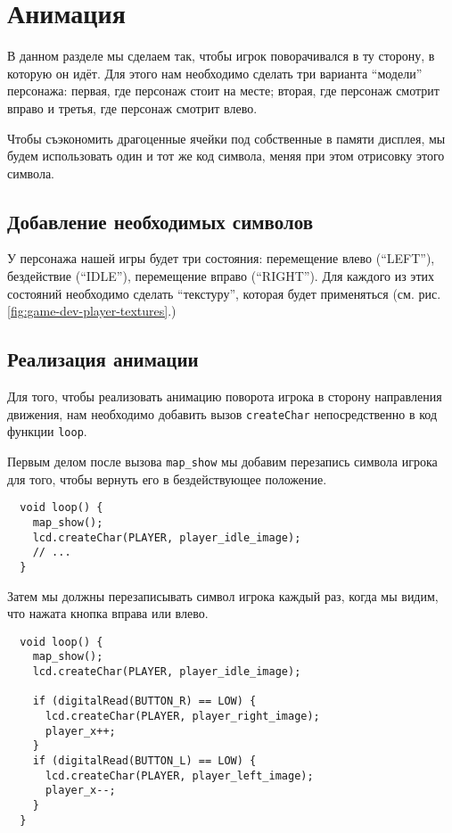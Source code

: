 \documentclass[../sparc.tex]{subfiles}
\begin{document}
\section{Анимация}

В данном разделе мы сделаем так, чтобы игрок поворачивался в ту сторону, в
которую он идёт.  Для этого нам необходимо сделать три варианта ``модели''
персонажа: первая, где персонаж стоит на месте; вторая, где персонаж смотрит
вправо и третья, где персонаж смотрит влево.

Чтобы съэкономить драгоценные ячейки под собственные в памяти дисплея, мы будем
использовать один и тот же код символа, меняя при этом отрисовку этого символа.

\subsection{Добавление необходимых символов}

У персонажа нашей игры будет три состояния: перемещение влево (``LEFT''),
бездействие (``IDLE''), перемещение вправо (``RIGHT'').  Для каждого из этих
состояний необходимо сделать ``текстуру'', которая будет применяться
(см. рис. \ref{fig:game-dev-player-textures}.)


\subsection{Реализация анимации}

Для того, чтобы реализовать анимацию поворота игрока в сторону направления
движения, нам необходимо добавить вызов \texttt{createChar} непосредственно в
код функции \texttt{loop}.

Первым делом после вызова \texttt{map\_show} мы добавим перезапись символа игрока
для того, чтобы вернуть его в бездействующее положение.

\begin{verbatim}
  void loop() {
    map_show();
    lcd.createChar(PLAYER, player_idle_image);
    // ...
  }
\end{verbatim}

Затем мы должны перезаписывать символ игрока каждый раз, когда мы видим, что
нажата кнопка вправа или влево.

\begin{verbatim}
  void loop() {
    map_show();
    lcd.createChar(PLAYER, player_idle_image);

    if (digitalRead(BUTTON_R) == LOW) {
      lcd.createChar(PLAYER, player_right_image);
      player_x++;
    }
    if (digitalRead(BUTTON_L) == LOW) {
      lcd.createChar(PLAYER, player_left_image);
      player_x--;
    }
  }
\end{verbatim}
\end{document}

